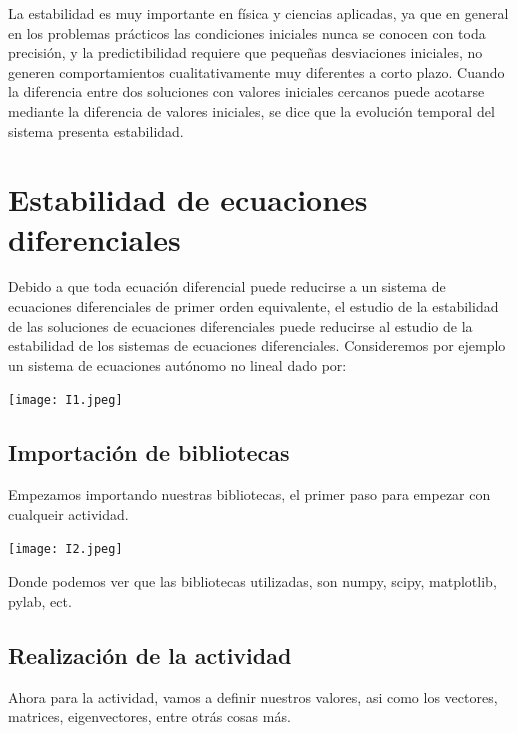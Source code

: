 \documentclass[12pt]{article}
\begin{document}
La estabilidad es muy importante en física y ciencias aplicadas, ya que en general en los problemas prácticos las condiciones iniciales nunca se conocen con toda precisión, y la predictibilidad requiere que pequeñas desviaciones iniciales, no generen comportamientos cualitativamente muy diferentes a corto plazo. Cuando la diferencia entre dos soluciones con valores iniciales cercanos puede acotarse mediante la diferencia de valores iniciales, se dice que la evolución temporal del sistema presenta estabilidad.\\






\section*{Estabilidad de ecuaciones diferenciales}

Debido a que toda ecuación diferencial puede reducirse a un sistema de ecuaciones diferenciales de primer orden equivalente, el estudio de la estabilidad de las soluciones de ecuaciones diferenciales puede reducirse al estudio de la estabilidad de los sistemas de ecuaciones diferenciales. Consideremos por ejemplo un sistema de ecuaciones autónomo no lineal dado por:

\begin{center}
    \texttt{[image: I1.jpeg]}
\end{center}




\subsection*{Importación de bibliotecas}
Empezamos importando nuestras bibliotecas, el primer paso para empezar con cualqueir actividad.

\begin{center}
    \texttt{[image: I2.jpeg]}
\end{center}
 
 Donde podemos ver que las bibliotecas utilizadas, son numpy, scipy, matplotlib, pylab, ect.




\subsection*{Realización de la actividad}
Ahora para la actividad, vamos a definir nuestros valores, asi como los vectores, matrices, eigenvectores, entre otrás cosas más.
\end{document}
